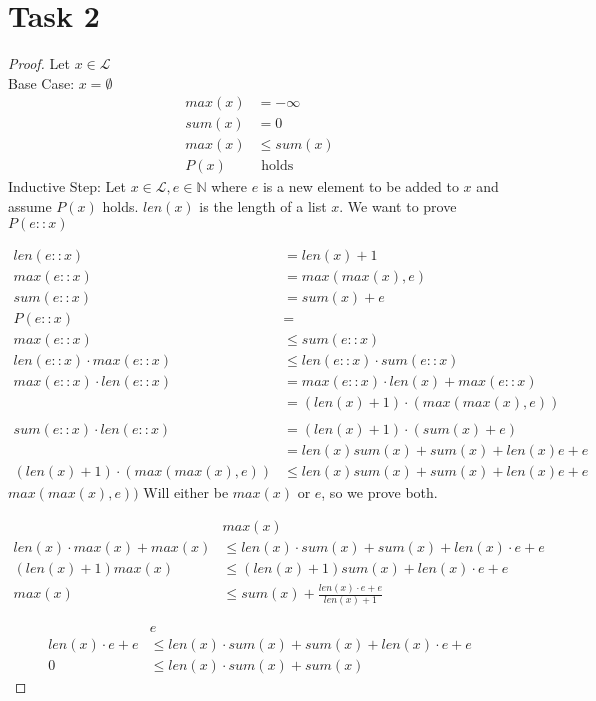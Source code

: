 \documentclass{article}
\begin{document}
	\section{Task 2}
	\begin{proof} 
		Let $x \in \mathcal{L}$ \\
		Base Case: 
		$x = \emptyset$
		\begin{align*}
			max(x) &= -\infty \\
			sum(x) &= 0 \\
			max(x) &\leq sum(x) \\ 
			P(x) &\text{  holds} 
		\end{align*}
		\noindent Inductive Step:
		Let $x \in \mathcal{L}, e \in \mathbb{N}$ where $e$ is a new element to be added to $x$ and assume $P(x)$ holds. $len(x)$ is the length of a list $x$. We want to prove $P(e::x)$
		
		\begin{align*}
			len(e::x) &= len(x) + 1 \\
			max(e::x) &= max(max(x), e) \\
			sum(e::x) &= sum(x) + e \\
			P(e::x)&= \\
			max(e::x) &\leq sum(e::x) \\
			len(e::x) \cdot max(e::x) &\leq len(e::x) \cdot sum(e::x) \\
			max(e::x)\cdot len(e::x) &= max(e::x) \cdot len(x) + max(e::x) \\
			&= (len(x) + 1)\cdot (max(max(x),e)) \\
			& \\
			sum(e::x) \cdot len(e::x) &= (len(x) + 1 ) \cdot (sum(x) + e) \\
			&= len(x)sum(x) + sum(x) + len(x)e + e \\
			(len(x) + 1)\cdot (max(max(x),e)) &\leq len(x)sum(x) + sum(x) + len(x)e + e
		\end{align*}
		\newpage
		$max(max(x),e))$ Will either be $max(x)$ or $e$, so we prove both.
		
		\begin{align*}
			&max(x) \\
			len(x)\cdot max(x) + max(x) &\leq len(x) \cdot sum(x) + sum(x) + len(x) \cdot e + e \\
			(len(x) + 1)max(x) &\leq (len(x) + 1)sum(x) + len(x) \cdot e + e  \\
			max(x) &\leq sum(x) + \frac{len(x) \cdot e + e}{len(x) + 1}
		\end{align*}
		
		\begin{align*}
			&e \\
			len(x)\cdot e + e &\leq len(x) \cdot sum(x) + sum(x) + len(x) \cdot e + e \\
			0 &\leq len(x) \cdot sum(x) + sum(x)
		\end{align*}
	\end{proof}
	\newpage
	
\end{document}
